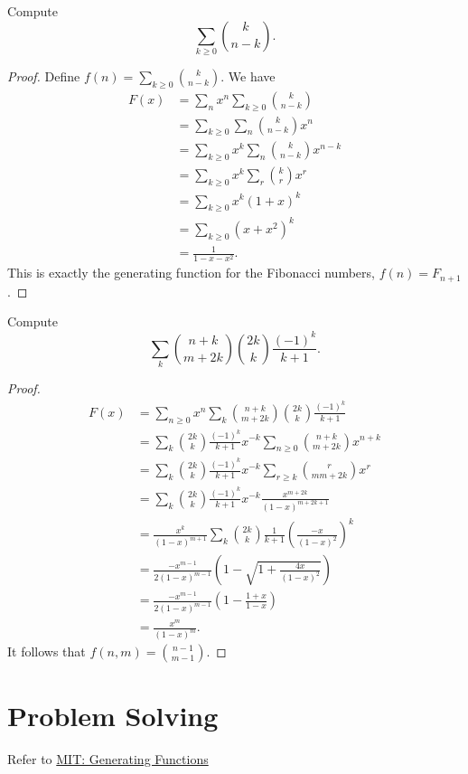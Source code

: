 \documentclass[11pt]{article}
\renewcommand{\>}{\rangle}
\newcommand{\<}{\langle}
\begin{document}
\begin{example} Compute $$\sum_{k \ge 0} \binom{k}{n-k}.$$

\end{example}
\begin{proof}
Define $f(n) = \sum_{k \ge 0} \binom{k}{n-k}$.  We have 
\begin{align*}
F(x) &= \sum_n x^n \sum_{k \ge 0} \binom{k}{n-k} \\
&= \sum_{k \ge 0} \sum_{n} \binom{k}{n-k} x^n \\
&= \sum_{k \ge 0} x^{k} \sum_{n} \binom{k}{n-k} x^{n-k} \\
&= \sum_{k \ge 0} x^k \sum_{r} \binom{k}{r} x^r \\
&= \sum_{k \ge 0} x^k (1 + x)^k \\
&= \sum_{k \ge 0} (x + x^2)^k \\
&= \frac{1}{1 - x -x^2}.
\end{align*}
This is exactly the generating function for the Fibonacci numbers, $f(n) = F_{n + 1}$.
\end{proof}
\begin{example} Compute 
$$\sum_k \binom{n + k}{m + 2k} \binom{2k}{k} \frac{(-1)^k}{k + 1}.$$
\end{example}
\begin{proof}
\begin{align*}
F(x) &= \sum_{n \ge 0} x^n \sum_{k} \binom{n + k}{m + 2k} \binom{2k}{k} \frac{(-1)^k}{k + 1} \\
&= \sum_k \binom{2k}{k} \frac{(-1)^k}{k + 1} x^{-k} \sum_{n \ge 0} \binom{n + k}{m + 2k} x^{n + k} \\
&= \sum_k \binom{2k}{k} \frac{(-1)^k}{k+1} x^{-k} \sum_{r\ge k} \binom{r}{mm + 2k} x^r \\
&= \sum_k \binom{2k}{k} \frac{(-1)^k}{k+1} x^{-k} \frac{x^{m + 2k}}{(1 - x)^{m + 2k + 1}} \\
&= \frac{x^k}{(1 - x)^{m + 1} }\sum_k \binom{2k}{k} \frac{1}{k + 1} \left(\frac{-x}{(1-x)^2} \right)^k \\
&= \frac{-x^{m-1}}{2(1-x)^{m-1}} \left (1 - \sqrt{1 + \frac{4x}{(1-x)^2}} \right) \\
&= \frac{-x^{m-1}}{2(1-x)^{m-1}} \left (1 - \frac{1+x}{1-x} \right) \\
&= \frac{x^m}{(1-x)^m}.
\end{align*}
It follows that $f(n, m) = \binom{n-1}{m-1}$.
\end{proof}
\pagebreak
\section{Problem Solving}
Refer to \href{https://ocw.mit.edu/courses/mathematics/18-a34-mathematical-problem-solving-putnam-seminar-fall-2018/assignments/MIT18_A34F18PS11.pdf}{MIT: Generating Functions}
 
\end{document}
